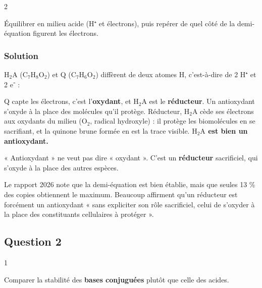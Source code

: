 \documentclass[11pt,a4paper]{article}
\newcommand{\equationajustee}[1]{%
  \sbox{\boiteequation}{$\displaystyle #1$}%
  \ifdim\wd\boiteequation>\linewidth
    \[\resizebox{\linewidth}{!}{\usebox{\boiteequation}}\]%
  \else
    \[#1\]%
  \fi}
\begin{document}
\begin{indication}{2}

Équilibrer en milieu acide (H⁺ et électrons), puis repérer de quel côté de la demi-équation figurent les électrons.

\end{indication}

\hypertarget{solution}{%
\subsubsection{Solution}\label{solution}}

\(\mathrm{H_2A}\) (\(\mathrm{C_7H_8O_2}\)) et Q (\(\mathrm{C_7H_6O_2}\)) diffèrent de deux atomes H, c'est-à-dire de 2 H⁺ et 2 e⁻ :

\equationajustee{\boxed{\mathrm{Q_{(aq)}} + 2\,\mathrm{H^+_{(aq)}} + 2\,\mathrm{e^-} = \mathrm{H_2A_{(aq)}}}}

Q capte les électrons, c'est l'\textbf{oxydant}, et \(\mathrm{H_2A}\) est le \textbf{réducteur}. Un antioxydant s'oxyde à la place des molécules qu'il protège. Réducteur, \(\mathrm{H_2A}\) cède ses électrons aux oxydants du milieu (\(\mathrm{O_2}\), radical hydroxyle) : il protège les biomolécules en se sacrifiant, et la quinone brune formée en est la trace visible. \textbf{\(\mathrm{H_2A}\) est bien un antioxydant.}

\begin{piege}

« Antioxydant » ne veut pas dire « oxydant ». C'est un \textbf{réducteur} sacrificiel, qui s'oxyde à la place des autres espèces.

\end{piege}

\begin{jury}

Le rapport 2026 note que la demi-équation est bien établie, mais que seules 13 \% des copies obtiennent le maximum. Beaucoup affirment qu'un réducteur est forcément un antioxydant « sans expliciter son rôle sacrificiel, celui de s'oxyder à la place des constituants cellulaires à protéger ».

\end{jury}

\hypertarget{question-2}{%
\subsection{Question 2}\label{question-2}}

\begin{indication}{1}

Comparer la stabilité des \textbf{bases conjuguées} plutôt que celle des acides.

\end{indication}
\end{document}
